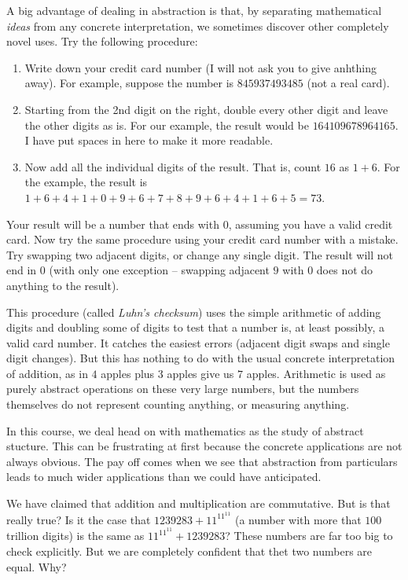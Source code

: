 A big advantage of dealing in abstraction is that, by separating mathematical \emph{ideas} from any concrete interpretation, we sometimes discover other completely novel uses. Try the following procedure: 
\begin{enumerate}
	\item Write down your credit card number (I will not ask you to give anhthing away). For example, suppose the number is $845937493485$ (not a real card). 
	\item Starting from the 2nd digit on the right, double every other digit and leave the other digits as is. For our example, the result would be $16 4 10 9 6 7 8 9 6 4 16 5$. I have put spaces in here to make it more readable.
	\item Now add all the individual digits of the result. That is, count $16$ as $1+6$. For the example, the result is $1+6+4+1+0+9+6+7+8+9+6+4+1+6+5 = 73$. 
\end{enumerate}
Your result will be a number that ends with $0$, assuming you have a valid credit card.
Now try the same procedure using your credit card number with a mistake. Try swapping two adjacent digits, or change any single digit.
The result will not end in $0$ (with only one exception -- swapping adjacent $9$ with $0$ does not do anything to the result).

This procedure (called \emph{Luhn's checksum}) uses the simple arithmetic of adding digits and doubling some of digits to test that a number is, at least possibly, a valid card number. 
It catches the easiest errors (adjacent digit swaps and single digit changes).
But this has nothing to do with the usual concrete interpretation of addition, as in $4$ apples plus $3$ apples give us $7$ apples.
Arithmetic is used as purely abstract operations on these very large numbers, but the numbers themselves do not represent counting anything, or measuring anything. 

In this course, we deal head on with mathematics as the study of abstract stucture.
This can be frustrating at first because the concrete applications are not always obvious.
The pay off comes when we see that abstraction from particulars leads to much wider applications than we could have anticipated.

We have claimed that addition and multiplication are commutative.
But is that really true? Is it the case that $1239283 + 11^{11^11}$ (a number with more that $100$ trillion digits) is the same as $11^{11^11} + 1239283$?
These numbers are far too big to check explicitly.
But we are completely confident that thet two numbers are equal.
Why? 


